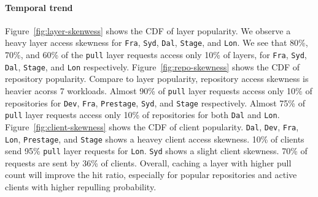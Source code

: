 \paragraph{Temporal trend}
Figure~\ref{fig:layer-skenwess} shows the CDF of layer popularity.
We observe a heavy layer access skewness for \texttt{Fra}, \texttt{Syd}, \texttt{Dal}, \texttt{Stage}, 
and \texttt{Lon}.
We see that 80\%, 70\%, and 60\% of the \texttt{pull} layer requests access only 10\% of layers, 
for \texttt{Fra}, \texttt{Syd}, \texttt{Dal}, \texttt{Stage}, 
and \texttt{Lon} respectively.
Figure~\ref{fig:repo-skewness} shows the CDF of repository popularity.
Compare to layer popularity, 
repository access skewness is heavier acorss 7 workloads.
Almost 90\% of \texttt{pull} layer requests access only 10\% of repositories for 
\texttt{Dev}, \texttt{Fra}, \texttt{Prestage}, \texttt{Syd}, and \texttt{Stage} respectively.
Almost 75\% of \texttt{pull} layer requests access only 10\% of repositories for
both \texttt{Dal} and \texttt{Lon}.
Figure~\ref{fig:client-skewness} shows the CDF of client popularity.
\texttt{Dal}, \texttt{Dev}, \texttt{Fra}, \texttt{Lon}, \texttt{Prestage}, and \texttt{Stage}
shows a heavey client access skewness.
10\% of clients send 95\% \texttt{pull} layer requests for \texttt{Lon}.
\texttt{Syd} shows a slight client skewness. 70\% of requests are sent by 36\% of clients.
Overall, caching a layer with higher pull count will improve the hit ratio, 
especially for popular repositories and active clients with higher repulling probability. 

